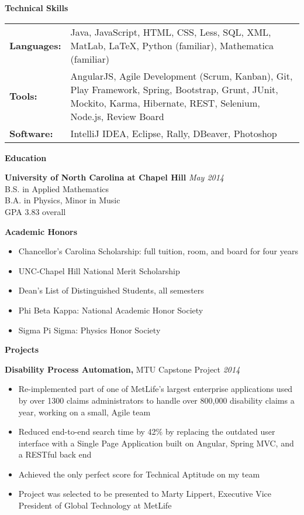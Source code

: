 \documentclass{article}
\newcommand{\bulletedList}[1]{
  \begin{itemize}[leftmargin=*] \itemsep -6pt
    #1
  \end{itemize}
}
\newcommand{\dateStyle}[1]{\textit{#1}}
\newcommand{\jobExperience}[4]{
  {\bf #1,} #2 \hfill \dateStyle{#3}
  \vspace{-6pt}
  \bulletedList{#4}
}
\newcommand{\projectExperience}[4]{\jobExperience{#1}{#2}{#3}{#4}}
\newcommand{\skillsTable}[1]{
  \hspace{-8pt}
  \begin{tabular}{p{0.75in} p{6.5in}}
    #1
  \end{tabular}
}
\newcommand{\skillsCategory}[2]{
  {\bf #1:} & #2 \\[4pt]
}
\newcommand{\resumeSection}[2]{
  {\bf #1}
  
  #2
  
  \vspace{-8pt}\hrulefill\vspace{-4pt}
}
\begin{document}

\resumeSection{Technical Skills}{
  \skillsTable{
    \skillsCategory{Languages}{
      Java,
      JavaScript,
      HTML,
      CSS,
      Less,
      SQL,
      XML,
      MatLab,
      LaTeX,
      Python (familiar),
      Mathematica (familiar)
    }
    \skillsCategory{Tools}{
      AngularJS,
      Agile Development (Scrum, Kanban),
      Git,
      Play Framework,
      Spring,
      Bootstrap,
      Grunt,
      JUnit,
      Mockito,
      Karma,
      Hibernate,
      REST,
      Selenium,
      Node.js,
      Review Board
    }
    \skillsCategory{Software}{
      IntelliJ IDEA,
      Eclipse,
      Rally,
      DBeaver,
      Photoshop
    }
  }
} 


\resumeSection{Education}{
  {\bf University of North Carolina at Chapel Hill} \hfill \dateStyle{May 2014} \\
  B.S. in Applied Mathematics \\
  B.A. in Physics, Minor in Music \\
  GPA 3.83 overall
}


\resumeSection{Academic Honors}{
  \bulletedList{
    \item Chancellor's Carolina Scholarship: full tuition, room, and board for four years
    \item UNC-Chapel Hill National Merit Scholarship
    \item Dean's List of Distinguished Students, all semesters
    \item Phi Beta Kappa: National Academic Honor Society
    \item Sigma Pi Sigma: Physics Honor Society
  }
}


\resumeSection{Projects}{
  \projectExperience{Disability Process Automation}{MTU Capstone Project}{2014}{
    \item Re-implemented part of one of MetLife's largest enterprise applications used by over 1300 claims administrators to handle over 800,000 disability claims a year, working on a small, Agile team
    \item Reduced end-to-end search time by 42\% by replacing the outdated user interface with a Single Page Application built on Angular, Spring MVC, and a RESTful back end
    \item Achieved the only perfect score for Technical Aptitude on my team
    \item Project was selected to be presented to Marty Lippert, Executive Vice President of Global Technology at MetLife
  }
}
\end{document}
